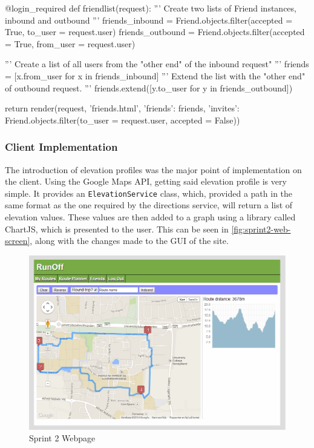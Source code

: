 \begin{code}[label={lst:sprint2-get-friends}, caption={'Friend List' function}, language={Python}]
@login_required
def friendlist(request):
	''' Create two lists of Friend instances, inbound and outbound '''
	friends_inbound = Friend.objects.filter(accepted = True, to_user = request.user)
	friends_outbound = Friend.objects.filter(accepted = True, from_user = request.user)
	
	''' Create a list of all users from the "other end" of the inbound request" '''
	friends = [x.from_user for x in friends_inbound]
	''' Extend the list with the "other end" of outbound request. '''
	friends.extend([y.to_user for y in friends_outbound])
	
	return render(request,
	              'friends.html',
	              {'friends': friends,
				   'invites': Friend.objects.filter(to_user = request.user, accepted = False)})
\end{code}

\subsubsection{Client Implementation}

The introduction of elevation profiles was the major point of implementation on the client. Using the Google Maps \ac{API}, getting said elevation profile is very simple. It provides an \texttt{ElevationService} class, which, provided a path in the same format as the one required by the directions service, will return a list of elevation values. These values are then added to a graph using a library called ChartJS\cite{chartjs}, which is presented to the user. This can be seen in \autoref{fig:sprint2-web-screen}, along with the changes made to the \ac{GUI} of the site.

\begin{figure}[ht]
 \centering
 \includegraphics[width=\textwidth]{img/webplanner2.png}
 \caption{Sprint 2 Webpage}
 \label{fig:sprint2-web-screen}
\end{figure}

